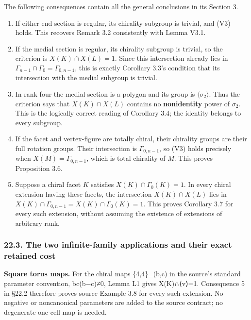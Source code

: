 \documentclass[
  10pt,
  letterpaper,
]{article}
\providecommand{\tightlist}{%
  \setlength{\itemsep}{0pt}\setlength{\parskip}{0pt}}
\begin{document}
The following consequences contain all the general conclusions in its
Section 3.

\begin{enumerate}
\def\labelenumi{\arabic{enumi}.}
\tightlist
\item
  If either end section is regular, its chirality subgroup is trivial,
  and (V3) holds. This recovers Remark 3.2 consistently with Lemma V3.1.
\item
  If the medial section is regular, its chirality subgroup is trivial,
  so the criterion is \(X(K)\cap X(L)=1\). Since this intersection
  already lies in \(\Gamma_{n-1}\cap\Gamma_0=\Gamma_{0,n-1}\), this is
  exactly Corollary 3.3's condition that its intersection with the
  medial subgroup is trivial.
\item
  In rank four the medial section is a polygon and its group is
  \(\langle\sigma_2\rangle\). Thus the criterion says that
  \(X(K)\cap X(L)\) contains no \textbf{nonidentity} power of
  \(\sigma_2\). This is the logically correct reading of Corollary 3.4;
  the identity belongs to every subgroup.
\item
  If the facet and vertex-figure are totally chiral, their chirality
  groups are their full rotation groups. Their intersection is
  \(\Gamma_{0,n-1}\), so (V3) holds precisely when
  \(X(M)=\Gamma_{0,n-1}\), which is total chirality of \(M\). This
  proves Proposition 3.6.
\item
  Suppose a chiral facet \(K\) satisfies \(X(K)\cap\Gamma_0(K)=1\). In
  every chiral extension having these facets, the intersection
  \(X(K)\cap X(L)\) lies in
  \(X(K)\cap\Gamma_{0,n-1}=X(K)\cap\Gamma_0(K)=1\). This proves
  Corollary 3.7 for every such extension, without assuming the existence
  of extensions of arbitrary rank.
\end{enumerate}

\subsubsection{22.3. The two infinite-family applications and their
exact retained
cost}\label{the-two-infinite-family-applications-and-their-exact-retained-cost}

\textbf{Square torus maps.} For the chiral maps \{4,4\}\_(b,c) in the
source's standard parameter convention, bc(b−c)≠0, Lemma L1 gives
X(K)∩⟨v⟩=1. Consequence 5 in §22.2 therefore proves source Example 3.8
for every such extension. No negative or noncanonical parameters are
added to the source contract; no degenerate one-cell map is needed.
\end{document}
